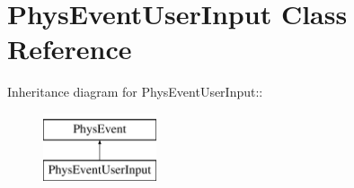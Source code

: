 \hypertarget{classPhysEventUserInput}{
\section{PhysEventUserInput Class Reference}
\label{dc/d0e/classPhysEventUserInput}
}
Inheritance diagram for PhysEventUserInput::\begin{figure}[H]
\begin{center}
\leavevmode
\includegraphics[height=2cm]{dc/d0e/classPhysEventUserInput}
\end{center}
\end{figure}
